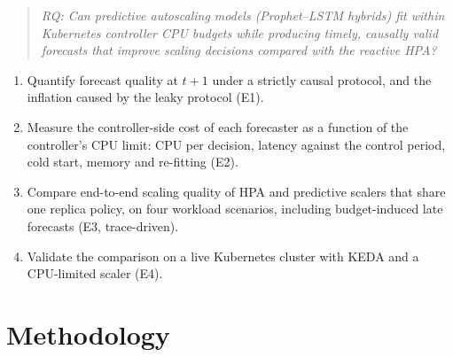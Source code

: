 \documentclass[11pt,a4paper]{article}
\begin{document}
\begin{quote}\itshape
RQ: Can predictive autoscaling models (Prophet--LSTM hybrids) fit within Kubernetes controller CPU budgets
while producing timely, causally valid forecasts that improve scaling decisions compared with the reactive HPA?
\end{quote}

\begin{enumerate}[label=O\arabic*]
\item Quantify forecast quality at $t{+}1$ under a strictly causal protocol, and the inflation caused by the
      leaky protocol (E1).
\item Measure the controller-side cost of each forecaster as a function of the controller's CPU limit:
      CPU per decision, latency against the control period, cold start, memory and re-fitting (E2).
\item Compare end-to-end scaling quality of HPA and predictive scalers that share one replica policy, on four
      workload scenarios, including budget-induced late forecasts (E3, trace-driven).
\item Validate the comparison on a live Kubernetes cluster with KEDA and a CPU-limited scaler (E4).
\end{enumerate}

\section{Methodology}
\end{document}
